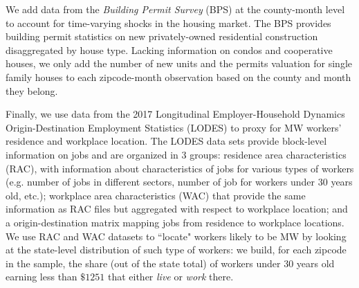 We add data from the \textit{Building Permit Survey} (BPS) at the county-month level to account for 
time-varying shocks in the housing market. The BPS provides building permit statistics on new 
privately-owned residential construction disaggregated by house type. Lacking information on condos 
and cooperative houses, we only add the number of new units and the permits valuation for single 
family houses to each zipcode-month observation based on the county and month they belong.

Finally, we use data from the 2017 Longitudinal Employer-Household Dynamics Origin-Destination 
Employment Statistics (LODES) to proxy for MW workers' residence and workplace location. The LODES 
data sets provide block-level information on jobs and are organized in 3 groups: residence area 
characteristics (RAC), with information about characteristics of jobs for various types of workers 
(e.g. number of jobs in different sectors, number of job for workers under 30 years old, etc.); 
workplace area characteristics (WAC) that provide the same information as RAC files but aggregated 
with respect to workplace location; and a origin-destination matrix mapping jobs from residence to workplace locations. We use RAC and WAC datasets to ``locate" workers likely to be MW by looking at 
the state-level distribution of such type of workers: we build, for each zipcode in the sample, the 
share (out of the state total) of workers under 30 years old earning less than $\$1251$ that either 
\textit{live} or \textit{work} there. 
